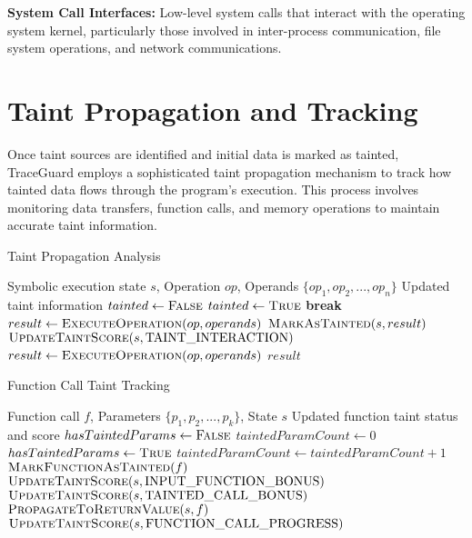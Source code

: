\textbf{System Call Interfaces:} Low-level system calls that interact with the operating system kernel, particularly those involved in inter-process communication, file system operations, and network communications.

\section{Taint Propagation and Tracking}

Once taint sources are identified and initial data is marked as tainted, TraceGuard employs a sophisticated taint propagation mechanism to track how tainted data flows through the program's execution. This process involves monitoring data transfers, function calls, and memory operations to maintain accurate taint information.

\begin{algorithm}
\caption{Taint Propagation Analysis}
\begin{algorithmic}[1]
\Require Symbolic execution state $s$, Operation $op$, Operands $\{op_1, op_2, ..., op_n\}$
\Ensure Updated taint information
\State $tainted \gets \textsc{False}$
        \State $tainted \gets \textsc{True}$
        \State \textbf{break}
    \EndIf
\EndFor
{}
    \State $result \gets \textsc{ExecuteOperation}(op, operands)$
    \State $\textsc{MarkAsTainted}(s, result)$
    \State $\textsc{UpdateTaintScore}(s, \text{TAINT\_INTERACTION})$
\Else
    \State $result \gets \textsc{ExecuteOperation}(op, operands)$
\EndIf
\State \Return $result$
\end{algorithmic}
\end{algorithm}

\begin{algorithm}
\caption{Function Call Taint Tracking}
\begin{algorithmic}[1]
\Require Function call $f$, Parameters $\{p_1, p_2, ..., p_k\}$, State $s$
\Ensure Updated function taint status and score
\State $hasTaintedParams \gets \textsc{False}$
\State $taintedParamCount \gets 0$
        \State $hasTaintedParams \gets \textsc{True}$
        \State $taintedParamCount \gets taintedParamCount + 1$
    \EndIf
\EndFor
{}
    \State $\textsc{MarkFunctionAsTainted}(f)$
        \State $\textsc{UpdateTaintScore}(s, \text{INPUT\_FUNCTION\_BONUS})$
    \Else
        \State $\textsc{UpdateTaintScore}(s, \text{TAINTED\_CALL\_BONUS})$
    \EndIf
    \State $\textsc{PropagateToReturnValue}(s, f)$
\Else
    \State $\textsc{UpdateTaintScore}(s, \text{FUNCTION\_CALL\_PROGRESS})$
\EndIf
\end{algorithmic}
\end{algorithm}

